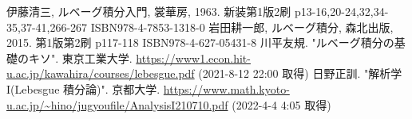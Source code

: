 \documentclass[dvipdfmx]{jsarticle}
\begin{document}
\begin{thebibliography}{50}
  伊藤清三, ルベーグ積分入門, 裳華房, 1963. 新装第1版2刷 p13-16,20-24,32,34-35,37-41,266-267 ISBN978-4-7853-1318-0
  岩田耕一郎, ルベーグ積分, 森北出版, 2015. 第1版第2刷 p117-118 ISBN978-4-627-05431-8
  川平友規. "ルベーグ積分の基礎のキソ". 東京工業大学. \url{https://www1.econ.hit-u.ac.jp/kawahira/courses/lebesgue.pdf}
  (2021-8-12 22:00 取得)
  日野正訓. "解析学 I(Lebesgue 積分論)". 京都大学. \url{https://www.math.kyoto-u.ac.jp/~hino/jugyoufile/AnalysisI210710.pdf} (2022-4-4 4:05 取得)
\end{thebibliography}
\end{document}
